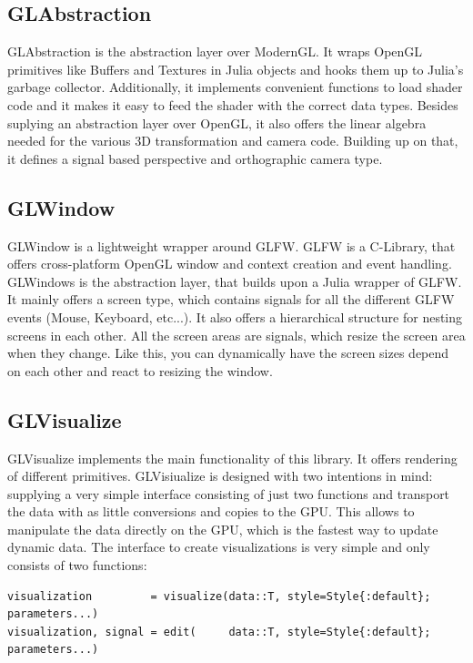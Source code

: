 \subsection{GLAbstraction}
GLAbstraction is the abstraction layer over ModernGL.
It wraps \ac{OpenGL} primitives like Buffers and Textures in Julia objects and hooks them up to Julia's garbage collector.
Additionally, it implements convenient functions to load shader code and it makes it easy to feed the shader with the correct data types.
Besides suplying an abstraction layer over \ac{OpenGL}, it also offers the linear algebra needed for the various 3D transformation and camera code.
Building up on that, it defines a signal based perspective and orthographic camera type.


\subsection{GLWindow}
GLWindow is a lightweight wrapper around GLFW. GLFW is a C-Library, that offers cross-platform \ac{OpenGL} window and context creation and event handling.
GLWindows is the abstraction layer, that builds upon a Julia wrapper of GLFW.
It mainly offers a screen type, which contains signals for all the different GLFW events (Mouse, Keyboard, etc...). 
It also offers a hierarchical structure for nesting screens in each other. 
All the screen areas are signals, which resize the screen area when they change. Like this, you can dynamically have the screen sizes depend on each other and react to resizing the window.



\subsection{GLVisualize}
GLVisualize implements the main functionality of this library.
It offers rendering of different primitives. GLVisiualize is designed with two intentions in mind: supplying a very simple interface consisting of just two functions and transport the data with as little conversions and copies to the GPU.
This allows to manipulate the data directly on the GPU, which is the fastest way to update dynamic data.
The interface to create visualizations is very simple and only consists of two functions:
\begin{lstlisting}
visualization 		  = visualize(data::T, style=Style{:default}; parameters...)
visualization, signal = edit(     data::T, style=Style{:default}; parameters...)
\end{lstlisting}

